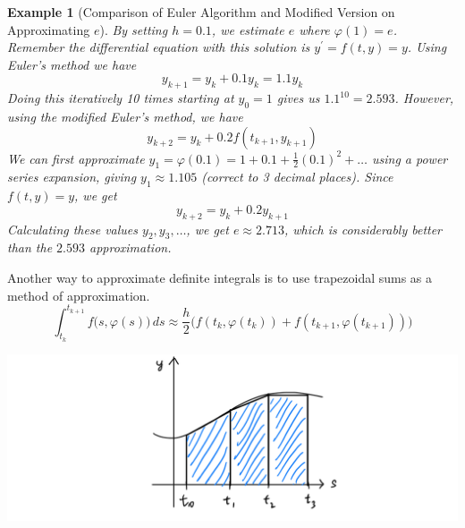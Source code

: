 \documentclass{article}
\newtheorem{example}{Example}[section]
\theoremstyle{remark}
\theoremstyle{definition}
\begin{document}
\begin{example}[Comparison of Euler Algorithm and Modified Version on Approximating $e$]
By setting $h = 0.1$, we estimate $e$ where $\varphi(1) = e$. Remember the differential equation with this solution is $y^\prime = f(t, y) = y$. Using Euler's method we have
\[y_{k+1} = y_k + 0.1 y_k = 1.1y_k\]
Doing this iteratively 10 times starting at $y_0 = 1$ gives us $1.1^{10} = 2.593$. However, using the modified Euler's method, we have 
\[y_{k+2} = y_k + 0.2 f(t_{k+1}, y_{k+1})\]
We can first approximate $y_1 = \varphi(0.1) = 1 + 0.1 + \frac{1}{2} (0.1)^2 + \ldots$ using a power series expansion, giving $y_1 \approx 1.105$ (correct to 3 decimal places). Since $f(t, y) = y$, we get 
\[y_{k+2} = y_k + 0.2 y_{k+1}\]
Calculating these values $y_2, y_3, \ldots$, we get $e \approx 2.713$, which is considerably better than the $2.593$ approximation. 
\end{example}

Another way to approximate definite integrals is to use trapezoidal sums as a method of approximation. 
\[\int_{t_k}^{t_{k+1}} f\big(s, \varphi(s)\big)\,ds \approx \frac{h}{2}\big( f(t_k, \varphi(t_k)) + f(t_{k+1}, \varphi(t_{k+1}))\big)\]

\begin{center}
    \includegraphics[scale=0.28]{img/Trapezoidal_Sum.PNG}
\end{center}
\end{document}

